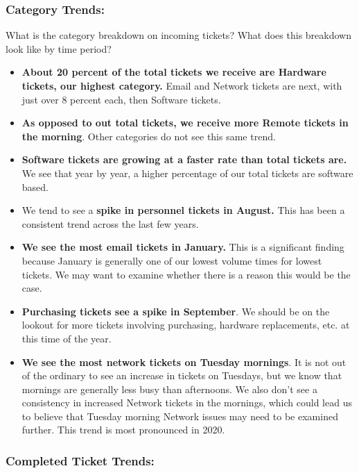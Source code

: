 \documentclass[11pt]{article}
\begin{document}
\hypertarget{category-trends}{%
\subsubsection{Category Trends:}\label{category-trends}}

What is the category breakdown on incoming tickets? What does this
breakdown look like by time period?

\begin{itemize}
\item
  \textbf{About 20 percent of the total tickets we receive are Hardware
  tickets, our highest category.} Email and Network tickets are next,
  with just over 8 percent each, then Software tickets. 
\item
  \textbf{As opposed to out total tickets, we receive more Remote
  tickets in the morning}. Other categories do not see this same trend. 
\item
  \textbf{Software tickets are growing at a faster rate than total
  tickets are.} We see that year by year, a higher percentage of our
  total tickets are software based. 
\item
  We tend to see a \textbf{spike in personnel tickets in August.} This
  has been a consistent trend across the last few years. 
\item
  \textbf{We see the most email tickets in January.} This is a
  significant finding because January is generally one of our lowest
  volume times for lowest tickets. We may want to examine whether there
  is a reason this would be the case. 
\item
  \textbf{Purchasing tickets see a spike in September}. We should be on
  the lookout for more tickets involving purchasing, hardware
  replacements, etc. at this time of the year. 
\item
  \textbf{We see the most network tickets on Tuesday mornings}. It is
  not out of the ordinary to see an increase in tickets on Tuesdays, but
  we know that mornings are generally less busy than afternoons. We also
  don't see a consistency in increased Network tickets in the mornings,
  which could lead us to believe that Tuesday morning Network issues may
  need to be examined further. This trend is most pronounced in 2020.
\end{itemize}

\hypertarget{completed-ticket-trends}{%
\subsubsection{Completed Ticket Trends:}\label{completed-ticket-trends}}
\end{document}
